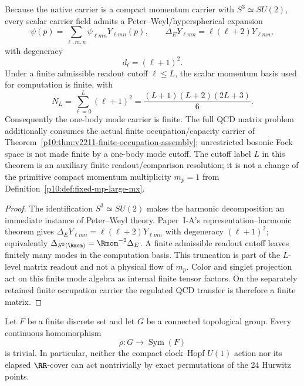 \documentclass[12pt,a4paper]{article}
\begin{document}
\begin{theorem}
\label{p10:thm:momentum-s3-harmonic-basis}
Because the native carrier is a compact momentum carrier with \(S^3\simeq SU(2)\), every scalar carrier field admits a Peter--Weyl/hyperspherical expansion~\cite{Peter1927,Weyl1946}
\begin{equation}
\label{p10:eq:s3-harmonic-expansion}
\psi(p)=\sum_{\ell,m,n}\psi_{\ell mn}Y_{\ell mn}(p),
\qquad
\Delta_EY_{\ell mn}=\ell(\ell+2)Y_{\ell mn},
\end{equation}
with degeneracy
\begin{equation}
\label{p10:eq:s3-degeneracy}
d_\ell=(\ell+1)^2 .
\end{equation}
Under a finite admissible readout cutoff \(\ell\le L\), the scalar momentum basis used for computation is finite, with
\begin{equation}
\label{p10:eq:s3-cutoff-mode-count}
N_L=\sum_{\ell=0}^L(\ell+1)^2=\frac{(L+1)(L+2)(2L+3)}6 .
\end{equation}
Consequently the one-body mode carrier is finite. The full QCD matrix
problem additionally consumes the actual finite occupation/capacity carrier
of Theorem~\ref{p10:thm:v2211-finite-occupation-assembly}; unrestricted
bosonic Fock space is not made finite by a one-body mode cutoff.  The cutoff label \(L\) in this theorem is an auxiliary finite readout/comparison resolution; it is not a change of the primitive compact momentum multiplicity \(m_p=1\) from Definition~\ref{p10:def:fixed-mp-large-mx}.
\end{theorem}
\begin{proof}
The identification \(S^3\simeq SU(2)\) makes the harmonic decomposition an immediate instance of Peter--Weyl theory.  Paper~I-A's representation--harmonic theorem gives \(\Delta_EY_{\ell mn}=\ell(\ell+2)Y_{\ell mn}\) with degeneracy \((\ell+1)^2\); equivalently \(\Delta_{S^3(\Rmom)}=\Rmom^{-2}\Delta_E\).  A finite admissible readout cutoff leaves finitely many modes in the computation basis.  This truncation is part of the \(L\)-level matrix readout and not a physical flow of \(m_p\).  Color and singlet projection act on this finite mode algebra as internal
finite tensor factors. On the separately retained finite occupation carrier
the regulated QCD transfer is therefore a finite matrix.\qedhere
\end{proof}

\begin{theorem}
\label{p10:thm:connected-flow-finite-shell-no-go}
Let \(F\) be a finite discrete set and let \(G\) be a connected topological
group.  Every continuous homomorphism
\[
 \rho:G\longrightarrow\operatorname{Sym}(F)
\]
is trivial.  In particular, neither the compact clock--Hopf \(U(1)\) action
nor its elapsed \(\RR\)-cover can act nontrivially by exact permutations of
the 24 Hurwitz points.
\end{theorem}
\end{document}
